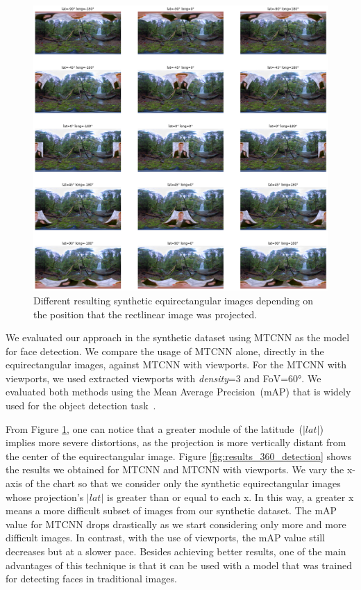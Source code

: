 \begin{figure}[!ht]
    \centering
    \includegraphics[width=1\linewidth]{img/video360/different_projections.png}
    \caption{Different resulting synthetic equirectangular images depending on the position that the rectlinear image was projected.}
    \label{fig:different_projections}
\end{figure}

We evaluated our approach in the synthetic dataset using MTCNN\cite{mtcnn} as the model for face detection. We compare the usage of MTCNN alone, directly in the equirectangular images, against MTCNN with viewports. For the MTCNN with viewports, we used extracted viewports with \emph{density}=3 and FoV=60°. We evaluated both methods using the Mean Average Precision~(mAP) that is widely used for the object detection task~\cite{map1, map2, map3, map4}. 


From Figure \ref{fig:different_projections}, one can notice that a greater module of the latitude~($|lat|$) implies more severe distortions, as the projection is more vertically distant from the center of the equirectangular image. Figure \ref{fig:results_360_detection} shows the results we obtained for MTCNN and MTCNN with viewports. 
We vary the x-axis of the chart so that we consider only the synthetic equirectangular images whose projection's $|lat|$ is greater than or equal to each x. In this way, a greater x means a more difficult subset of images from our synthetic dataset. The mAP value for MTCNN drops drastically as we start considering only more and more difficult images. In contrast, with the use of viewports, the mAP value still decreases but at a slower pace. Besides achieving better results, one of the main advantages of this technique is that it can be used with a model that was trained for detecting faces in traditional images.

